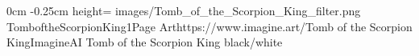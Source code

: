 \documentclass[letterpaper,openany,twoside,twocolumn]{book}
\begin{document}
	\DungeonSheetGeometry

		{0cm}%
		{-0.25cm}%
		{height=\paperheight}%
		{images/Tomb_of_the_Scorpion_King_filter.png}%
		{%
			{TomboftheScorpionKing1}{Page \thepage}{Art}{https://www.imagine.art/}{Tomb of the Scorpion King}{ImagineAI}%
		}%
		{Tomb of the Scorpion King}%
		{black/white}%
	
\end{document}
